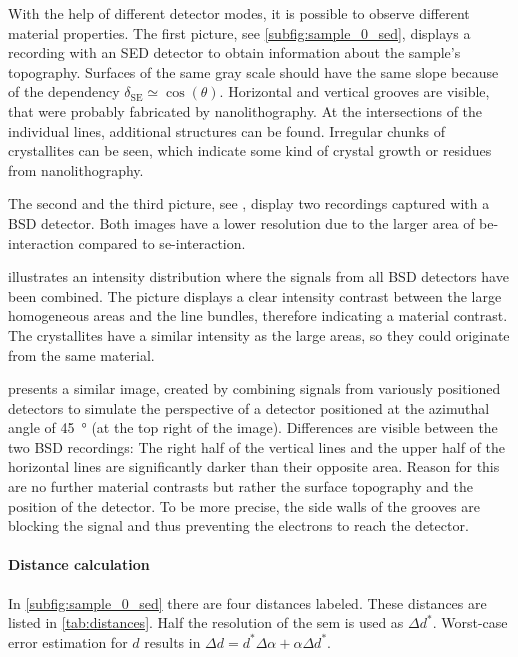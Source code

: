 With the help of different detector modes, it is possible to observe
different material properties.
The first picture, see \cref{subfig:sample_0_sed}, displays a recording
with an SED detector to obtain information about the sample's topography.
Surfaces of the same gray scale should have the same slope because of the
dependency $\delta_\mathrm{SE} \simeq \cos(\theta)$.
Horizontal and vertical grooves are visible, that were probably
fabricated by nanolithography.
At the intersections of the individual lines, additional structures can
be found.
Irregular chunks of crystallites can be seen, which indicate
some kind of crystal growth or residues from nanolithography.

The second and the third picture, see
, display two
recordings captured with a BSD detector.
Both images have a lower resolution due to the larger area of
\ac{be}-interaction compared to \ac{se}-interaction.

 illustrates an intensity
distribution where the signals from all BSD detectors have been combined.
The picture displays a clear intensity contrast between the large
homogeneous areas and the line bundles, therefore indicating a material
contrast.
The crystallites have a similar intensity as the large areas, so they
could originate from the same material.

 presents a similar image, created by
combining signals from variously positioned detectors to simulate the
perspective of a detector positioned at the azimuthal angle of
\qty{45}{\degree} (at the top right of the image).
Differences are visible between the two BSD recordings: The right
half of the vertical lines and the upper half of the horizontal lines
are significantly darker than their opposite area.
Reason for this are no further material contrasts but rather the surface
topography and the position of the detector.
To be more precise, the side walls of the grooves are blocking the signal and
thus preventing the electrons	to reach the detector.

\paragraph{Distance calculation}
In \cref{subfig:sample_0_sed} there are four distances labeled.
These distances are listed in \cref{tab:distances}.
Half the resolution of the \ac{sem} is used as $\Delta d^*$. 
Worst-case error estimation for $d$ results in  $\Delta d=d^{*}\Delta\alpha+\alpha\Delta d^{*}$.

